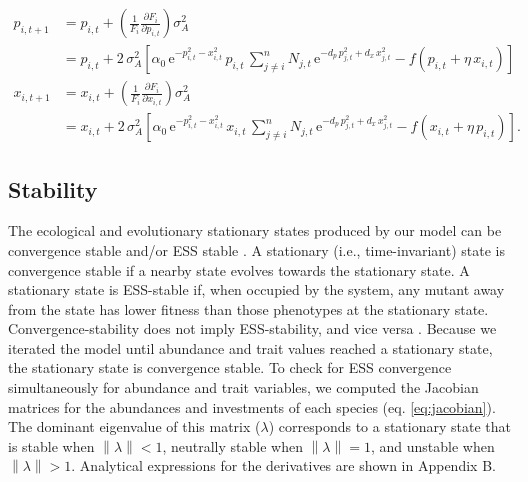 \begin{equation} \label{eq:invest-change}
\begin{split}
    p_{i,t+1} &= p_{i,t} + \left( \frac{1}{F_i}
        \frac{\partial F_i}{\partial p_{i,t}} \right) \sigma^2_A \\
        &= p_{i,t} + 2 \, \sigma_A^2 \left[
            \alpha_0 \, \text{e}^{-p_{i,t}^2 - x_{i,t}^2} \, p_{i,t} \,
            \sum_{j \ne i}^{n}{ N_{j,t} \, \text{e}^{ 
                -d_p \, p_{j,t}^2 + d_x \, x_{j,t}^2 } }
            - f \left( p_{i,t} + \eta \, x_{i,t} \right) 
        \right]\\[1ex]
    x_{i,t+1} &= x_{i,t} + \left( \frac{1}{F_i}
        \frac{\partial F_i}{\partial x_{i,t}} \right) \sigma^2_A \\
         &= x_{i,t} + 2 \, \sigma_A^2 \left[
            \alpha_0 \, \text{e}^{-p_{i,t}^2 - x_{i,t}^2} \, x_{i,t} \,
            \sum_{j \ne i}^{n}{ N_{j,t} \, \text{e}^{ 
                -d_p \, p_{j,t}^2 + d_x \, x_{j,t}^2 } }
            - f \left( x_{i,t} + \eta \, p_{i,t} \right) 
        \right]
    \textrm{.}
\end{split}
\end{equation}



\subsection*{Stability}

The ecological and evolutionary stationary states produced by our model
can be convergence stable and/or ESS stable \citep{Geritz1998}.
A stationary (i.e., time-invariant) state is convergence stable if a
nearby state evolves towards the stationary state. A stationary state is
ESS-stable if, when occupied by the system, any mutant away from the
state has lower fitness than those phenotypes at the stationary state.
Convergence-stability does not imply ESS-stability, and vice versa
\citep{Geritz1998}. Because we iterated the model until
abundance and trait values reached a stationary state, the stationary
state is convergence stable. To check for ESS convergence simultaneously
for abundance and trait variables, we computed the Jacobian matrices for
the abundances and investments of each species (eq. \ref{eq:jacobian}). 
The dominant eigenvalue of this matrix ($\lambda$) corresponds to a stationary
state that is stable when $\left\lVert\lambda\right\lVert < 1$, 
neutrally stable when $\left\lVert\lambda\right\lVert = 1$, and 
unstable when $\left\lVert\lambda\right\lVert > 1$. Analytical
expressions for the derivatives are shown in Appendix B.

